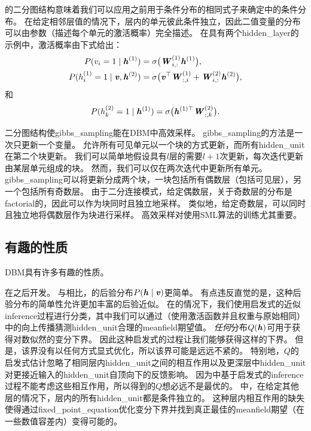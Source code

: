 的二分图结构意味着我们可以应用之前用于条件分布的相同式子来确定中的条件分布。
在给定相邻层值的情况下，层内的单元彼此条件独立，因此二值变量的分布可以由参数（描述每个单元的激活概率）完全描述。
在具有两个\gls{hidden_layer}的示例中，激活概率由下式给出：
\begin{align}
 P(v_i=1  \mid  \boldsymbol{\mathit{h}}^{(1)}) &= \sigma \big( \boldsymbol{\mathit{W}}_{i,:}^{(1)}\boldsymbol{\mathit{h}}^{(1)} \big), \\
 P(h_i^{(1)}=1  \mid  \boldsymbol{\mathit{v}}, \boldsymbol{\mathit{h}}^{(2)}) &= \sigma \big( \boldsymbol{\mathit{v}}^\top  \boldsymbol{\mathit{W}}_{:,i}^{(1)}
 + \boldsymbol{\mathit{W}}_{i,:}^{(2)}\boldsymbol{\mathit{h}}^{(2)} \big) ,
\end{align}
和
\begin{align}
P(h_k^{(2)} =1  \mid  \boldsymbol{\mathit{h}}^{(1)}) = \sigma \big(\boldsymbol{\mathit{h}}^{(1)\top} \boldsymbol{\mathit{W}}_{:,k}^{(2)} \big).
\end{align}


二分图结构使\gls{gibbs_sampling}能在\gls{DBM}中高效采样。
\gls{gibbs_sampling}的方法是一次只更新一个变量。
允许所有可见单元以一个块的方式更新，而所有\gls{hidden_unit}在第二个块更新。
我们可以简单地假设具有$l$层的需要$l+1$次更新，每次迭代更新由某层单元组成的块。
然而，我们可以仅在两次迭代中更新所有单元。
\gls{gibbs_sampling}可以将更新分成两个块，一块包括所有偶数层（包括可见层），另一个包括所有奇数层。
由于二分连接模式，给定偶数层，关于奇数层的分布是\gls{factorial}的，因此可以作为块同时且独立地采样。
类似地，给定奇数层，可以同时且独立地将偶数层作为块进行采样。
高效采样对使用\gls{SML}算法的训练尤其重要。


\subsection{有趣的性质}
\gls{DBM}具有许多有趣的性质。

在之后开发。
与相比，的后验分布$P(\boldsymbol{\mathit{h}}  \mid  \boldsymbol{\mathit{v}})$更简单。
有点违反直觉的是，这种后验分布的简单性允许更加丰富的后验近似。
在的情况下，我们使用启发式的近似\gls{inference}过程进行分类，其中我们可以通过（使用激活函数并且权重与原始相同）中的向上传播猜测\gls{hidden_unit}合理的\gls{meanfield}期望值。
\emph{任何}分布$Q(\boldsymbol{\mathit{h}})$可用于获得对数似然的变分下界。
因此这种启发式的过程让我们能够获得这样的下界。
但是，该界没有以任何方式显式优化，所以该界可能是远远不紧的。
特别地，$Q$的启发式估计忽略了相同层内\gls{hidden_unit}之间的相互作用以及更深层中\gls{hidden_unit}对更接近输入的\gls{hidden_unit}自顶向下的反馈影响。
因为中基于启发式的\gls{inference}过程不能考虑这些相互作用，所以得到的$Q$想必远不是最优的。
中，在给定其他层的情况下，层内的所有\gls{hidden_unit}都是条件独立的。
这种层内相互作用的缺失使得通过\gls{fixed_point_equation}优化变分下界并找到真正最佳的\gls{meanfield}期望（在一些数值容差内）变得可能的。

